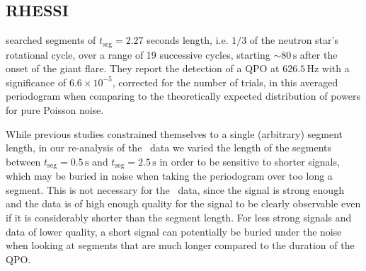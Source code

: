 \documentclass{emulateapj}
\begin{document}
\subsection{RHESSI}
\label{sec:rhessi_results}

\citealt{Watts06} searched segments of $t_{\mathrm{seg}} = 2.27$ seconds length, i.e. $1/3$ of the neutron star's rotational cycle, over a range of 19 successive cycles, starting $\sim 80 \, \mathrm{s}$ after the onset of the giant flare. They report the detection of a QPO at $626.5 \, \mathrm{Hz}$ with a significance of $6.6 \times 10^{-5}$, corrected for the number of trials, in this averaged periodogram when comparing to the theoretically expected distribution of powers for pure Poisson noise.

While previous studies constrained themselves to a single (arbitrary) segment length, in our re-analysis of the \rhessi\ data we varied the length of the segments between $t_{\mathrm{seg}} = 0.5 \, \mathrm{s}$ and $t_{\mathrm{seg}} = 2.5 \, \mathrm{s}$  in order to be sensitive to shorter signals, which may be buried in noise when taking the periodogram over too long a segment. This is not necessary for the \rxte\ data, since the signal is strong enough and the data is of high enough quality for the signal to be clearly observable even if it is considerably shorter than the segment length. For less strong signals and data of lower quality, a short signal can potentially be buried under the noise when looking at segments that are much longer compared to the duration of the QPO. 
\end{document}
